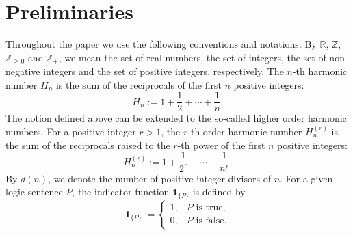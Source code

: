 \documentclass[12pt,a4paper]{amsart}
\numberwithin{equation}{section}
\theoremstyle{plain}
\theoremstyle{definition}
\theoremstyle{remark}
\begin{document}
\section{Preliminaries}
Throughout the paper we use the following conventions and notations. By $\mathbb{R}$, $\mathbb{Z}$, $\mathbb{Z}_{\ge 0}$ and $\mathbb{Z}_+$, we mean the set of real numbers, the set of integers, the set of non-negative integers and the set of positive integers, respectively. The $n$-th harmonic number $H_n$ is the sum of the reciprocals of the first $n$ positive integers:
$$H_n:=1+\frac{1}{2}+\cdots+\frac{1}{n}.$$
The notion defined above can be extended to the so-called higher order harmonic numbers. For a positive integer $r>1$, the $r$-th order harmonic number $H_n^{(r)}$ is the sum of the reciprocals raised to the $r$-th power of the first $n$ positive integers:
$$H_n^{(r)}:=1+\frac{1}{2^r}+\cdots+\frac{1}{n^r}.$$
By $d(n)$, we denote the number of positive integer divisors of $n$. For a given logic sentence $P$, the indicator function  $\mathbf 1_{\{P\}}$ is defined by
$$
\mathbf 1_{\{P\}}:=
\begin{cases}
1,& P\text{ is true},\\
0,& P\text{ is false}.
\end{cases}
$$
\end{document}
